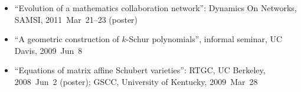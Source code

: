 \documentclass[10pt,a4paper]{article}
\begin{document}
\begin{itemize}[label=$\circ$,nolistsep]
\item
``Evolution of a mathematics collaboration network'': Dynamics On Networks, SAMSI, 2011~Mar~21--23 (poster)
\item
``A geometric construction of \(k\)-Schur polynomials'', informal seminar, UC Davis, 2009~Jun~8
\item
``Equations of matrix affine Schubert varieties'': RTGC, UC Berkeley, 2008~Jun~2 (poster); GSCC, University of Kentucky, 2009~Mar~28
\end{itemize}
\end{document}
